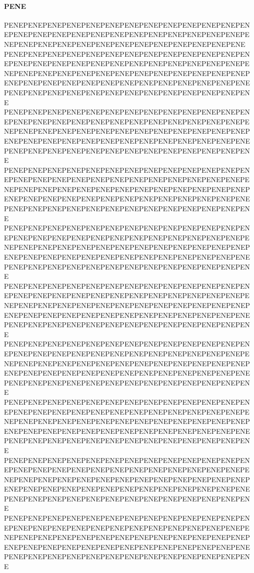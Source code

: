 \paragraph{PENE}
PENEPENEPENEPENEPENEPENEPENEPENEPENEPENEPENEPENEPENEPENEPENEPENEPENEPENEPENEPENEPENEPENEPENEPENEPENEPENEPENEPENEPENEPENEPENEPENEPENEPENEPENEPENEPENEPENE
PENEPENEPENEPENEPENEPENEPENEPENEPENEPENEPENEPENEPENEPENEPENEPENEPENEPENEPENEPENEPENEPENEPENEPENEPENEPENEPENEPENEPENEPENEPENEPENEPENEPENEPENEPENEPENEPENEPENEPENEPENEPENEPENEPENEPENEPENEPENEPENEPENEPENEPENEPENEPENEPENEPENEPENEPENEPENEPENEPENEPENEPENEPENEPENE
PENEPENEPENEPENEPENEPENEPENEPENEPENEPENEPENEPENEPENEPENEPENEPENEPENEPENEPENEPENEPENEPENEPENEPENEPENEPENEPENEPENEPENEPENEPENEPENEPENEPENEPENEPENEPENEPENEPENEPENEPENEPENEPENEPENEPENEPENEPENEPENEPENEPENEPENEPENEPENEPENEPENEPENEPENEPENEPENEPENEPENEPENEPENEPENE
PENEPENEPENEPENEPENEPENEPENEPENEPENEPENEPENEPENEPENEPENEPENEPENEPENEPENEPENEPENEPENEPENEPENEPENEPENEPENEPENEPENEPENEPENEPENEPENEPENEPENEPENEPENEPENEPENEPENEPENEPENEPENEPENEPENEPENEPENEPENEPENEPENEPENEPENEPENEPENEPENEPENEPENEPENEPENEPENEPENEPENEPENEPENEPENE
PENEPENEPENEPENEPENEPENEPENEPENEPENEPENEPENEPENEPENEPENEPENEPENEPENEPENEPENEPENEPENEPENEPENEPENEPENEPENEPENEPENEPENEPENEPENEPENEPENEPENEPENEPENEPENEPENEPENEPENEPENEPENEPENEPENEPENEPENEPENEPENEPENEPENEPENEPENEPENEPENEPENEPENEPENEPENEPENEPENEPENEPENEPENEPENE
PENEPENEPENEPENEPENEPENEPENEPENEPENEPENEPENEPENEPENEPENEPENEPENEPENEPENEPENEPENEPENEPENEPENEPENEPENEPENEPENEPENEPENEPENEPENEPENEPENEPENEPENEPENEPENEPENEPENEPENEPENEPENEPENEPENEPENEPENEPENEPENEPENEPENEPENEPENEPENEPENEPENEPENEPENEPENEPENEPENEPENEPENEPENEPENE
PENEPENEPENEPENEPENEPENEPENEPENEPENEPENEPENEPENEPENEPENEPENEPENEPENEPENEPENEPENEPENEPENEPENEPENEPENEPENEPENEPENEPENEPENEPENEPENEPENEPENEPENEPENEPENEPENEPENEPENEPENEPENEPENEPENEPENEPENEPENEPENEPENEPENEPENEPENEPENEPENEPENEPENEPENEPENEPENEPENEPENEPENEPENEPENE
PENEPENEPENEPENEPENEPENEPENEPENEPENEPENEPENEPENEPENEPENEPENEPENEPENEPENEPENEPENEPENEPENEPENEPENEPENEPENEPENEPENEPENEPENEPENEPENEPENEPENEPENEPENEPENEPENEPENEPENEPENEPENEPENEPENEPENEPENEPENEPENEPENEPENEPENEPENEPENEPENEPENEPENEPENEPENEPENEPENEPENEPENEPENEPENE
PENEPENEPENEPENEPENEPENEPENEPENEPENEPENEPENEPENEPENEPENEPENEPENEPENEPENEPENEPENEPENEPENEPENEPENEPENEPENEPENEPENEPENEPENEPENEPENEPENEPENEPENEPENEPENEPENEPENEPENEPENEPENEPENEPENEPENEPENEPENEPENEPENEPENEPENEPENEPENEPENEPENEPENEPENEPENEPENEPENEPENEPENEPENEPENE
PENEPENEPENEPENEPENEPENEPENEPENEPENEPENEPENEPENEPENEPENEPENEPENEPENEPENEPENEPENEPENEPENEPENEPENEPENEPENEPENEPENEPENEPENEPENEPENEPENEPENEPENEPENEPENEPENEPENEPENEPENEPENEPENEPENEPENEPENEPENEPENEPENEPENEPENEPENEPENEPENEPENEPENEPENEPENEPENEPENEPENEPENEPENEPENE
